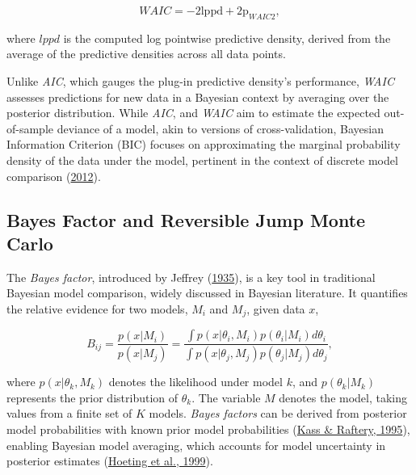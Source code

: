 \documentclass[
  11pt,
]{article}
\begin{document}
\begin{equation}
WAIC = -2\text{lppd} + 2\text{p}_{WAIC2},
\end{equation}

where \(lppd\) is the computed log pointwise predictive density, derived
from the average of the predictive densities across all data points.

Unlike \emph{AIC}, which gauges the plug-in predictive density's
performance, \emph{WAIC} assesses predictions for new data in a Bayesian
context by averaging over the posterior distribution. While \emph{AIC},
and \emph{WAIC} aim to estimate the expected out-of-sample deviance of a
model, akin to versions of cross-validation, Bayesian Information
Criterion (BIC) focuses on approximating the marginal probability
density of the data under the model, pertinent in the context of
discrete model comparison (\protect\hyperlink{ref-Neath2012}{2012}).

\subsection{Bayes Factor and Reversible Jump Monte Carlo}

The \emph{Bayes factor}, introduced by Jeffrey
(\protect\hyperlink{ref-jeffreys1935}{1935}), is a key tool in
traditional Bayesian model comparison, widely discussed in Bayesian
literature. It quantifies the relative evidence for two models, \(M_i\)
and \(M_j\), given data \(x\),

\begin{equation}
B_{ij} = \frac{p(x|M_i)}{p(x|M_j)} = \frac{\int p(x|\theta_i,M_i)p(\theta_i|M_i)d\theta_i}{\int p(x|\theta_j,M_j)p(\theta_j|M_j)d\theta_j},
\end{equation}

where \(p(x|\theta_k,M_k)\) denotes the likelihood under model \(k\),
and \(p(\theta_k|M_k)\) represents the prior distribution of
\(\theta_k\). The variable \(M\) denotes the model, taking values from a
finite set of \(K\) models. \emph{Bayes factors} can be derived from
posterior model probabilities with known prior model probabilities
(\protect\hyperlink{ref-Kass1995}{Kass \& Raftery, 1995}), enabling
Bayesian model averaging, which accounts for model uncertainty in
posterior estimates (\protect\hyperlink{ref-Hoeting1999}{Hoeting et al.,
1999}).
\end{document}
